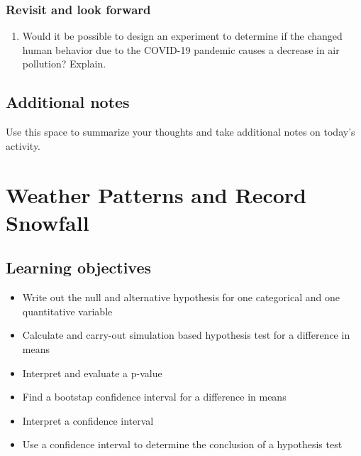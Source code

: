 \documentclass[
]{report}
\providecommand{\tightlist}{%
  \setlength{\itemsep}{0pt}\setlength{\parskip}{0pt}}
\begin{document}
\vspace{3in}

\hypertarget{revisit-and-look-forward}{%
\subsection*{Revisit and look forward}\label{revisit-and-look-forward}}

\begin{enumerate}
\def\labelenumi{\arabic{enumi}.}
\setcounter{enumi}{22}
\tightlist
\item
  Would it be possible to design an experiment to determine if the changed human behavior due to the COVID-19 pandemic causes a decrease in air pollution? Explain.
  \vspace{1in}
\end{enumerate}

\hypertarget{additional-notes}{%
\section{Additional notes}\label{additional-notes}}

Use this space to summarize your thoughts and take additional notes on today's activity.

\hypertarget{weather-patterns-and-record-snowfall}{%
\chapter{Weather Patterns and Record Snowfall}\label{weather-patterns-and-record-snowfall}}

\newcommand\latexcode[1]{#1}

\hypertarget{learning-objectives}{%
\section{Learning objectives}\label{learning-objectives}}

\begin{itemize}
\item
  Write out the null and alternative hypothesis for one categorical and one quantitative variable
\item
  Calculate and carry-out simulation based hypothesis test for a difference in means
\item
  Interpret and evaluate a p-value
\item
  Find a bootstap confidence interval for a difference in means
\item
  Interpret a confidence interval
\item
  Use a confidence interval to determine the conclusion of a hypothesis test
\end{itemize}
\end{document}
